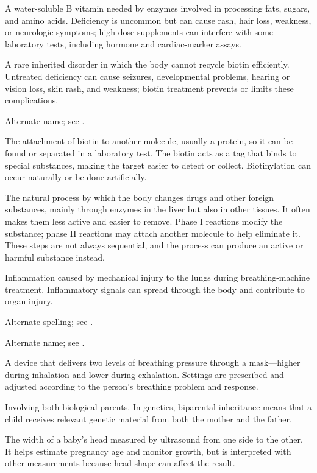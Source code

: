  A water-soluble B vitamin needed by enzymes involved in processing fats, sugars, and amino acids. Deficiency is uncommon but can cause rash, hair loss, weakness, or neurologic symptoms; high-dose supplements can interfere with some laboratory tests, including hormone and cardiac-marker assays.

 A rare inherited disorder in which the body cannot recycle biotin efficiently. Untreated deficiency can cause seizures, developmental problems, hearing or vision loss, skin rash, and weakness; biotin treatment prevents or limits these complications.

 Alternate name; see .

 The attachment of biotin to another molecule, usually a protein, so it can be found or separated in a laboratory test. The biotin acts as a tag that binds to special substances, making the target easier to detect or collect. Biotinylation can occur naturally or be done artificially.

 The natural process by which the body changes drugs and other foreign substances, mainly through enzymes in the liver but also in other tissues. It often makes them less active and easier to remove. Phase I reactions modify the substance; phase II reactions may attach another molecule to help eliminate it. These steps are not always sequential, and the process can produce an active or harmful substance instead.

 Inflammation caused by mechanical injury to the lungs during breathing-machine treatment. Inflammatory signals can spread through the body and contribute to organ injury.

 Alternate spelling; see .

 Alternate name; see .

 A device that delivers two levels of breathing pressure through a mask—higher during inhalation and lower during exhalation. Settings are prescribed and adjusted according to the person's breathing problem and response.

 Involving both biological parents. In genetics, biparental inheritance means that a child receives relevant genetic material from both the mother and the father.

 The width of a baby's head measured by ultrasound from one side to the other. It helps estimate pregnancy age and monitor growth, but is interpreted with other measurements because head shape can affect the result.

